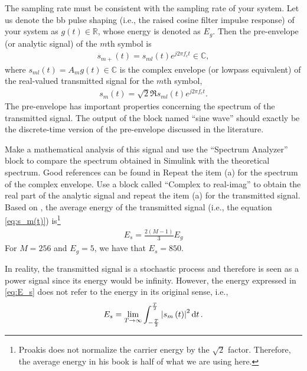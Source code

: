 \documentclass[12pt,a4paper]{article}
\begin{document}
The sampling rate must be consistent with the sampling rate of your system. Let us denote the \gls{bb} pulse shaping (i.e., the raised cosine filter impulse response) of your system as \(g\left( t \right) \in \mathbb{R}\), whose energy is denoted as \(E_g\). Then the pre-envelope (or analytic signal) of the \(m\)th symbol is
\begin{align}
    s_{m+}\left( t \right) = s_{ml}\left( t \right) e^{j 2\pi f_c t} \in \mathbb{C},
\end{align}
where \(s_{ml}\left( t \right) = A_m g\left( t \right) \in \mathbb{C}\) is the complex envelope (or lowpass equivalent) of the real-valued transmitted signal for the \(m\)th symbol,
\begin{align}
    \label{eq:s_m(t)}
    s_{m}\left( t \right) = \sqrt{2} \Re{s_{ml}\left( t \right) e^{j 2\pi f_c t}}.
\end{align}
The pre-envelope has important properties concerning the spectrum of the transmitted signal. The output of the block named ``sine wave'' should exactly be the discrete-time version of the pre-envelope discussed in the literature.

\subproblem Make a mathematical analysis of this signal and use the ``Spectrum Analyzer'' block to compare the spectrum obtained in Simulink with the theoretical spectrum. Good references can be found in \cite{mengaliSynchronizationTechniquesDigital1997,meyrDigitalCommunicationReceivers1998,proakisDigitalCommunications2007}
\subproblem Repeat the item (a) for the spectrum of the complex envelope.
\subproblem Use a block called ``Complex to real-imag'' to obtain the real part of the analytic signal and repeat the item (a) for the transmitted signal.
\subproblem Based on \cite[Equation (3.2-42)]{proakisDigitalCommunications2007}, the average energy of the transmitted signal (i.e., the equation \eqref{eq:s_m(t)}) is\footnote{Proakis does not normalize the carrier energy by the \(\sqrt{2}\) factor. Therefore, the average energy in his book is half of what we are using here.}
\begin{align}
    \label{eq:E_s}
    E_s = \frac{2\left( M-1 \right)}{3}E_g
\end{align}
For \(M = 256\) and \(E_g = 5\), we have that \(E_s = 850\).

In reality, the transmitted signal is a stochastic process and therefore is seen as a power signal since its energy would be infinity. However, the energy expressed in \eqref{eq:E_s} does not refer to the energy in its original sense, i.e.,
\begin{align}
    E_s = \lim_{T \rightarrow \infty} \int_{-\frac{T}{2}}^{\frac{T}{2}} \abs{s_m \left( t \right)}^{2} \dd{t}.
\end{align}
\end{document}
